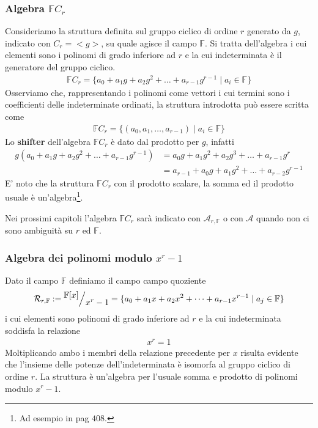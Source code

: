 \subsubsection{Algebra $\mathbb{F}C_{r}$}
Consideriamo la struttura definita sul gruppo ciclico di ordine
$r$ generato da $g$, indicato con $C_{r} = < g >$, su quale agisce il campo
$\mathbb{F}$.
Si tratta dell'algebra i cui elementi sono i polinomi di grado
inferiore ad $r$ e la cui indeterminata è il generatore del gruppo ciclico.
\begin{align*}
\mathbb{F}C_{r} = \lbrace
a_0 + a_1 g + a_2 g^2 + \dots + a_{r-1} g^{r-1}
\mid a_{i} \in \mathbb{F}
\rbrace
\end{align*}
Osserviamo che, rappresentando i polinomi come vettori i cui
termini sono i coefficienti delle indeterminate ordinati, la
struttura introdotta può essere scritta come
\begin{align*}
\mathbb{F}C_r = \lbrace (a_0, a_1, \dots, a_{r-1} ) \mid a_{i} \in \mathbb{F}
\rbrace
\end{align*}
Lo {\bf shifter} dell'algebra $\mathbb{F}C_{r}$ è dato dal prodotto per $g$, infatti
\begin{align*}
g(a_0 + a_1 g + a_2 g^2 + \dots + a_{r-1} g^{r-1} )
&= a_0 g + a_1 g^2 + a_2 g^3 + \dots + a_{r-1} g^{r}
\\
&= a_{r-1} + a_0 g + a_1 g^2 + \dots + a_{r-2} g^{r-1}
\end{align*}
E' noto che la struttura $\mathbb{F}C_{r}$ con il prodotto scalare, la somma
ed il prodotto usuale è un'algebra\footnote{Ad esempio in \cite{jacobson} pag $408$.}.

Nei prossimi capitoli l'algebra $\mathbb{F}C_{r}$ sarà indicato con
$\mathcal{A}_{r, \mathbb{F}}$ o con $\mathcal{A} $ quando non ci sono
ambiguità su $r$ ed $\mathbb{F}$.

\subsubsection{Algebra dei polinomi modulo $x^{r} -1$}

Dato il campo $\mathbb{F}$ definiamo il campo campo quoziente
\begin{align*}
\mathcal{R}_{r, \mathbb{F}} := \quotient{\mathbb{F} \lbrack x \rbrack  }{ x^{r}
- 1} = \lbrace a_0 + a_1 x + a_2 x^2 + \dots + a_{r-1} x^{r-1} \mid a_{j} \in \mathbb{F} \rbrace
\end{align*}
i cui elementi sono polinomi di grado inferiore ad
$r$ e la cui indeterminata soddisfa la relazione
\begin{align*}
x^r = 1
\end{align*}
Moltiplicando ambo i membri della relazione precedente per $x$ risulta evidente
che l'insieme delle potenze dell'indeterminata è isomorfa al gruppo ciclico di
ordine $r$. La struttura è un'algebra per l'usuale somma e prodotto di
polinomi modulo $x^{r} - 1$.

